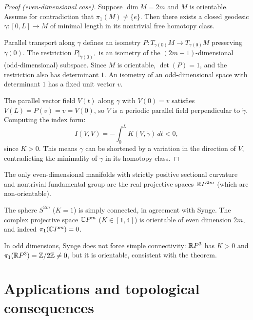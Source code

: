 \begin{proof}[Proof (even-dimensional case)]
Suppose $\dim M = 2m$ and $M$ is orientable. Assume for contradiction that
$\pi_1(M) \neq \{e\}$. Then there exists a closed geodesic
$\gamma : [0, L] \to M$ of minimal length in its nontrivial free homotopy class.

Parallel transport along $\gamma$ defines an isometry
$P : T_{\gamma(0)}M \to T_{\gamma(0)}M$ preserving $\dot{\gamma}(0)$.
The restriction $P|_{\dot{\gamma}(0)^\perp}$ is an isometry of the
$(2m-1)$-dimensional (odd-dimensional) subspace. Since $M$ is orientable,
$\det(P) = 1$, and the restriction also has determinant $1$. An isometry
of an odd-dimensional space with determinant $1$ has a fixed unit vector $v$.

The parallel vector field $V(t)$ along $\gamma$ with $V(0) = v$ satisfies
$V(L) = P(v) = v = V(0)$, so $V$ is a periodic parallel field perpendicular
to $\dot{\gamma}$. Computing the index form:
\[
    I(V, V) = -\int_0^L K(V, \dot{\gamma}) \, dt < 0,
\]
since $K > 0$. This means $\gamma$ can be shortened by a variation in the
direction of $V$, contradicting the minimality of $\gamma$ in its homotopy class.
\end{proof}

\begin{corollary}
The only even-dimensional manifolds with strictly positive sectional curvature
and nontrivial fundamental group are the real projective spaces $\mathbb{R} P^{2m}$
(which are non-orientable).
\end{corollary}

\begin{example}[$S^{2m}$ and $\C P^m$]
The sphere $S^{2m}$ ($K = 1$) is simply connected, in agreement with Synge.
The complex projective space $\C P^m$ ($K \in [1, 4]$) is orientable of even
dimension $2m$, and indeed $\pi_1(\mathbb{C} P^m) = 0$.
\end{example}

\begin{example}[$S^3$ and $\R P^3$]
In odd dimensions, Synge does not force simple connectivity: $\R P^3$ has $K > 0$
and $\pi_1(\mathbb{R} P^3) = \mathbb{Z}/2\mathbb{Z} \neq 0$, but it is orientable, consistent with the theorem.
\end{example}

\section{Applications and topological consequences}

